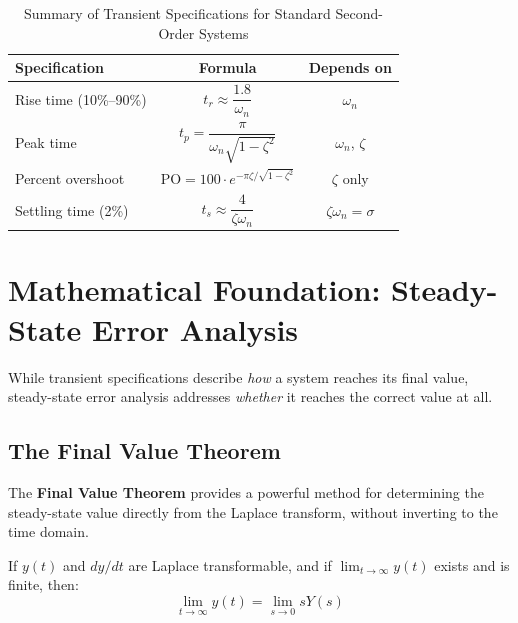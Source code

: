 \begin{table}[H]
\centering
\caption{Summary of Transient Specifications for Standard Second-Order Systems}
\label{tab:transient_summary}
\begin{tabular}{lcc}
\toprule
\textbf{Specification} & \textbf{Formula} & \textbf{Depends on} \\
\midrule
Rise time (10\%--90\%) & $t_r \approx \dfrac{1.8}{\omega_n}$ & $\omega_n$ \\[1.5ex]
Peak time & $t_p = \dfrac{\pi}{\omega_n\sqrt{1-\zeta^2}}$ & $\omega_n$, $\zeta$ \\[1.5ex]
Percent overshoot & $\text{PO} = 100 \cdot e^{-\pi\zeta/\sqrt{1-\zeta^2}}$ & $\zeta$ only \\[1.5ex]
Settling time (2\%) & $t_s \approx \dfrac{4}{\zeta\omega_n}$ & $\zeta\omega_n = \sigma$ \\[1.5ex]
\bottomrule
\end{tabular}
\end{table}

\section{Mathematical Foundation: Steady-State Error Analysis}

While transient specifications describe \textit{how} a system reaches its final value, steady-state error analysis addresses \textit{whether} it reaches the correct value at all.

\subsection{The Final Value Theorem}

The \textbf{Final Value Theorem} provides a powerful method for determining the steady-state value directly from the Laplace transform, without inverting to the time domain.

\begin{keyconceptbox}
If $y(t)$ and $dy/dt$ are Laplace transformable, and if $\lim_{t\to\infty} y(t)$ exists and is finite, then:
\begin{equation}
    \boxed{\lim_{t\to\infty} y(t) = \lim_{s\to 0} sY(s)}
    \label{eq:final_value_theorem}
\end{equation}
\end{keyconceptbox}

